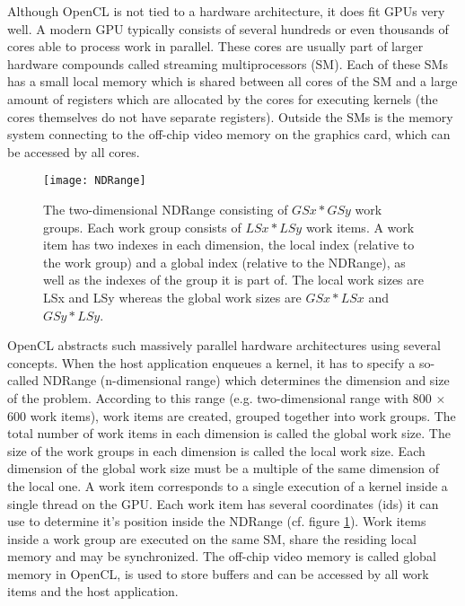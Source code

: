 Although OpenCL is not tied to a hardware architecture, it does fit GPUs very well. A modern GPU typically consists of several hundreds or even thousands of cores able to process work in parallel. These cores are usually part of larger hardware compounds called streaming multiprocessors (SM). Each of these SMs has a small local memory which is shared between all cores of the SM and a large amount of registers which are allocated by the cores for executing kernels (the cores themselves do not have separate registers). Outside the SMs is the memory system connecting to the off-chip video memory on the graphics card, which can be accessed by all cores. 

\begin{figure} 
\centering
\texttt{[image: NDRange]}
\caption{The two-dimensional NDRange consisting of $GSx * GSy$ work groups. Each work group consists of $LSx * LSy$ work items. A work item has two indexes in each dimension, the local index (relative to the work group) and a global index (relative to the NDRange), as well as the indexes of the group it is part of. The local work sizes are LSx and LSy whereas the global work sizes are $GSx * LSx$ and $GSy * LSy$.}
\label{fig:NDRange}
\end{figure}

OpenCL abstracts such massively parallel hardware architectures using several concepts. When the host application enqueues a kernel, it has to specify a so-called NDRange (n-dimensional range) which determines the dimension and size of the problem. According to this range (e.g. two-dimensional range with 800 $\times$ 600 work items), work items are created, grouped together into work groups. The total number of work items in each dimension is called the global work size. The size of the work groups in each dimension is called the local work size. Each dimension of the global work size must be a multiple of the same dimension of the local one. A work item corresponds to a single execution of a kernel inside a single thread on the GPU. Each work item has several coordinates (ids) it can use to determine it's position inside the NDRange (cf. figure \ref{fig:NDRange}). Work items inside a work group are executed on the same SM, share the residing local memory and may be synchronized. The off-chip video memory is called global memory in OpenCL, is used to store buffers and can be accessed by all work items and the host application.
